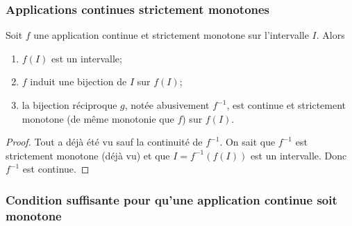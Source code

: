 \subsubsection{Applications continues strictement monotones}

\begin{theo}
  Soit \(f\) une application continue et strictement monotone sur l'intervalle
  \(I\). Alors
  \begin{enumerate}
    \item \(f(I)\) est un intervalle;
    \item \(f\) induit une bijection de \(I\) sur \(f(I)\);
    \item la bijection réciproque \(g\), notée abusivement \(f^{-1}\), est
      continue et strictement monotone (de même monotonie que \(f\)) sur
      \(f(I)\).
  \end{enumerate}
\end{theo}
\begin{proof}
  Tout a déjà été vu sauf la continuité de \(f^{-1}\). On sait que \(f^{-1}\)
  est strictement monotone (déjà vu) et que \(I=f^{-1}(f(I))\) est un
  intervalle. Donc \(f^{-1}\) est continue.
\end{proof}

\subsubsection[Pour qu'une application continue soit monotone]{Condition
suffisante pour qu'une application continue soit monotone}


